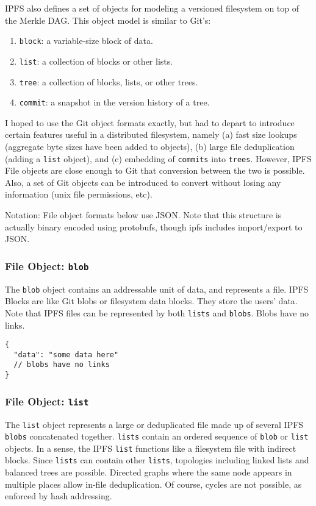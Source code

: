 \documentclass{sig-alternate}
\begin{document}
IPFS also defines a set of objects for modeling a versioned filesystem on top of the Merkle DAG. This object model is similar to Git's:

\begin{enumerate}
  \item \texttt{block}: a variable-size block of data.
  \item \texttt{list}: a collection of blocks or other lists.
  \item \texttt{tree}: a collection of blocks, lists, or other trees.
  \item \texttt{commit}: a snapshot in the version history of a tree.
\end{enumerate}

I hoped to use the Git object formats exactly, but had to depart to introduce certain features useful in a distributed filesystem, namely (a) fast size lookups (aggregate byte sizes have been added to objects), (b) large file deduplication (adding a \texttt{list} object), and (c) embedding of \texttt{commits} into \texttt{trees}. However, IPFS File objects are close enough to Git that conversion between the two is possible. Also, a set of Git objects can be introduced to convert without losing any information (unix file permissions, etc).

Notation: File object formats below use JSON. Note that this structure is actually binary encoded using protobufs, though ipfs includes import/export to JSON.

\subsubsection{File Object: \texttt{blob}}

The \texttt{blob} object contains an addressable unit of data, and
represents a file. IPFS Blocks are like Git blobs or filesystem data blocks. They store the users' data. Note that IPFS files can be represented by both \texttt{lists} and \texttt{blobs}. Blobs have no links.

\begin{verbatim}
{
  "data": "some data here"
  // blobs have no links
}
\end{verbatim}

\subsubsection{File Object: \texttt{list}}

The \texttt{list} object represents a large or deduplicated file made up of
several IPFS \texttt{blobs} concatenated together. \texttt{lists} contain
an ordered sequence of \texttt{blob} or \texttt{list} objects.
In a sense, the IPFS \texttt{list} functions like a filesystem file with
indirect blocks. Since \texttt{lists} can contain other \texttt{lists}, topologies including linked lists and balanced trees are possible. Directed graphs where the same node appears in multiple places allow in-file deduplication. Of course, cycles are not possible, as enforced by hash addressing.
\end{document}
